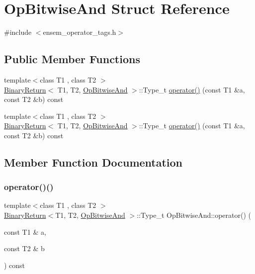 \hypertarget{structOpBitwiseAnd}{}\section{Op\+Bitwise\+And Struct Reference}
\label{structOpBitwiseAnd}


{\ttfamily \#include $<$ensem\+\_\+operator\+\_\+tags.\+h$>$}

\subsection*{Public Member Functions}
\begin{DoxyCompactItemize}
\item 
{\footnotesize template$<$class T1 , class T2 $>$ }\\\mbox{\hyperlink{structBinaryReturn}{Binary\+Return}}$<$ T1, T2, \mbox{\hyperlink{structOpBitwiseAnd}{Op\+Bitwise\+And}} $>$\+::Type\+\_\+t \mbox{\hyperlink{structOpBitwiseAnd_aa3f0de5d7060f7385f0fb035d16f09d3}{operator()}} (const T1 \&a, const T2 \&b) const
\item 
{\footnotesize template$<$class T1 , class T2 $>$ }\\\mbox{\hyperlink{structBinaryReturn}{Binary\+Return}}$<$ T1, T2, \mbox{\hyperlink{structOpBitwiseAnd}{Op\+Bitwise\+And}} $>$\+::Type\+\_\+t \mbox{\hyperlink{structOpBitwiseAnd_aa3f0de5d7060f7385f0fb035d16f09d3}{operator()}} (const T1 \&a, const T2 \&b) const
\end{DoxyCompactItemize}


\subsection{Member Function Documentation}
\mbox{\label{structOpBitwiseAnd_aa3f0de5d7060f7385f0fb035d16f09d3}} 
\subsubsection{\texorpdfstring{operator()()}{operator()()}\hspace{0.1cm}{\footnotesize\ttfamily [1/2]}}
{\footnotesize\ttfamily template$<$class T1 , class T2 $>$ \\
\mbox{\hyperlink{structBinaryReturn}{Binary\+Return}}$<$T1, T2, \mbox{\hyperlink{structOpBitwiseAnd}{Op\+Bitwise\+And}} $>$\+::Type\+\_\+t Op\+Bitwise\+And\+::operator() (\begin{DoxyParamCaption}\item[{const T1 \&}]{a,  }\item[{const T2 \&}]{b }\end{DoxyParamCaption}) const\hspace{0.3cm}{\ttfamily [inline]}}

